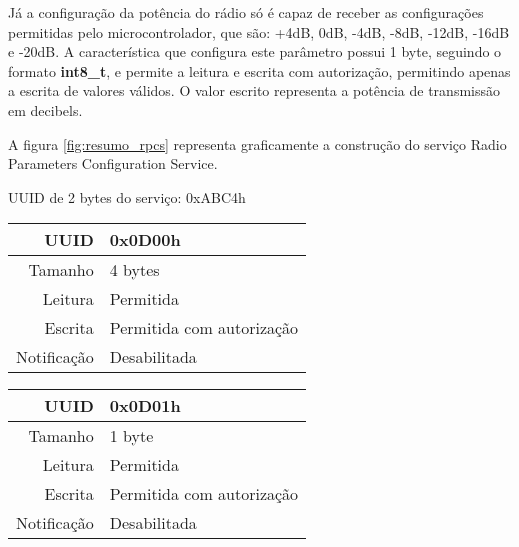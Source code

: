 Já a configuração da potência do rádio só é capaz de receber as configurações
permitidas pelo microcontrolador, que são: +4dB, 0dB, -4dB, -8dB, -12dB, -16dB e
-20dB\cite{nRF51RefManual}. A característica que configura este parâmetro possui
1 byte, seguindo o formato \textbf{int8\_t}, e permite a leitura e escrita com
autorização, permitindo apenas a escrita de valores válidos. O valor escrito
representa a potência de transmissão em decibels.

A figura \ref{fig:resumo_rpcs} representa graficamente a construção do serviço
Radio Parameters Configuration Service.

\begin{tcolorbox}[arc=3mm,fontupper=\small,fonttitle=\bfseries,
subtitle style={boxrule=0.4pt, colback=white},colframe=green!25!black,
halign=center,bottom=0mm,
title=Radio Parameter Configuration Service]
	UUID de 2 bytes do serviço: 0xABC4h
	
	\begin{tcbitemize}[raster columns=2,raster equal height,fontupper=\footnotesize,
	colbacktitle=yellow!100!red!100!black, coltitle=black,
	fonttitle=\footnotesize\bfseries,size=small, halign=center]
	
	\tcbitem [squeezed title={Advertising Interval Characteristic}]
		\begin{tabular}{ r | l }
		UUID & 0x0D00h \\ \hline
		Tamanho & 4 bytes \\ \hline
		Leitura & Permitida \\ \hline
		Escrita & Permitida com autorização \\ \hline
		Notificação & Desabilitada 
		\end{tabular}

		\tcbitem [squeezed title={Advertising TX Power Characteristic}]
		\begin{tabular}{ r | l }
		UUID & 0x0D01h \\ \hline
		Tamanho & 1 byte \\ \hline
		Leitura & Permitida \\ \hline
		Escrita & Permitida com autorização \\ \hline
		Notificação & Desabilitada 
		\end{tabular}

	\end{tcbitemize}
	\tcblower
	\label{fig:resumo_rpcs}
\end{tcolorbox}

